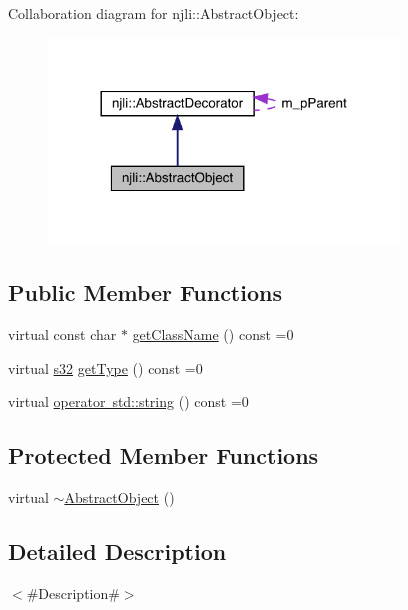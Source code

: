 Collaboration diagram for njli\+:\+:Abstract\+Object\+:\nopagebreak
\begin{figure}[H]
\begin{center}
\leavevmode
\includegraphics[width=264pt]{classnjli_1_1_abstract_object__coll__graph}
\end{center}
\end{figure}
\subsection*{Public Member Functions}
\begin{DoxyCompactItemize}
\item 
virtual const char $\ast$ \mbox{\hyperlink{classnjli_1_1_abstract_object_afdabb48c4bf763e297ffe810b433a863}{get\+Class\+Name}} () const =0
\item 
virtual \mbox{\hyperlink{_util_8h_aa62c75d314a0d1f37f79c4b73b2292e2}{s32}} \mbox{\hyperlink{classnjli_1_1_abstract_object_a08dcf202a47f0782813b8bc98c659e78}{get\+Type}} () const =0
\item 
virtual \mbox{\hyperlink{classnjli_1_1_abstract_object_afc07f4138bd3003910e7aa7fa0fe11ad}{operator std\+::string}} () const =0
\end{DoxyCompactItemize}
\subsection*{Protected Member Functions}
\begin{DoxyCompactItemize}
\item 
virtual \mbox{\hyperlink{classnjli_1_1_abstract_object_aadfc508440196d05461ebf48fd3d3625}{$\sim$\+Abstract\+Object}} ()
\end{DoxyCompactItemize}


\subsection{Detailed Description}
$<$\#\+Description\#$>$ 

